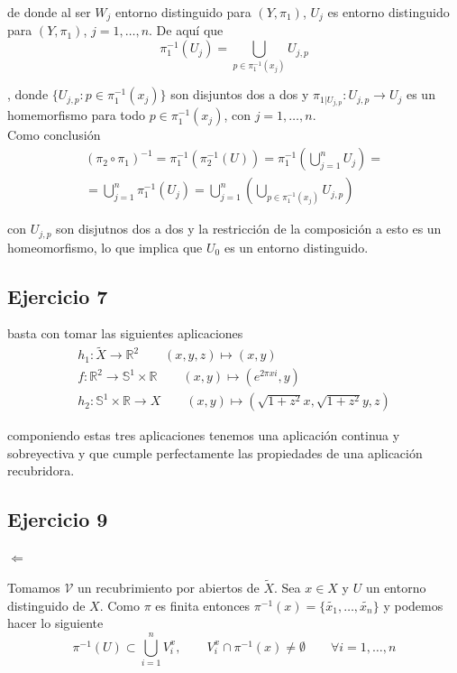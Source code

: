 \documentclass{article}
\begin{document}
de donde al ser $W_j$ entorno distinguido para $(Y,\pi_1)$, $U_j$ es entorno distinguido para $(Y,\pi_1)$, $j=1,\ldots,n$. De aquí que
\begin{equation*}
\pi_1^{-1}(U_j)=\bigcup_{p\in \pi_1^{-1}(x_j)} U_{j,p}
\end{equation*}

, donde $\{U_{j,p}: p\in \pi_1^{-1}(x_j)\}$ son disjuntos dos a dos y $\pi_{1|U_{j,p}}:U_{j,p}\rightarrow U_j$ es un homemorfismo para todo $p\in \pi_1^{-1}(x_j)$, con $j=1,\ldots,n$.\\

Como conclusión
\begin{gather*}
(\pi_2\circ \pi_1)^{-1}=\pi_1^{-1}(\pi_2^{-1}(U))=\pi_1^{-1}(\bigcup_{j=1}^n U_j)=\\
=\bigcup_{j=1}^n \pi_1^{-1}(U_j)=\bigcup_{j=1}^n(\bigcup_{p\in \pi_1^{-1}(x_j)} U_{j,p})
\end{gather*}

con $U_{j,p}$ son disjutnos dos a dos y la restricción de la composición a esto es un homeomorfismo, lo que implica que $U_0$ es un entorno distinguido.

\subsection{Ejercicio 7}
basta con tomar las siguientes aplicaciones
\begin{gather*}
h_1:\tilde{X}\rightarrow \mathbb{R}^2 \qquad (x,y,z)\mapsto (x,y)\\
f:\mathbb{R}^2\rightarrow \mathbb{S}^1\times \mathbb{R}\qquad (x,y)\mapsto (e^{2\pi xi}, y)\\
h_2:\mathbb{S}^1\times \mathbb{R}\rightarrow X \qquad (x,y)\mapsto(\sqrt{1+z^2} x,\sqrt{1+z^2}y,z)
\end{gather*}

componiendo estas tres aplicaciones tenemos una aplicación continua y sobreyectiva y que cumple perfectamente las propiedades de una aplicación recubridora.

\subsection{Ejercicio 9}
$\Leftarrow$

Tomamos $\mathcal{V}$ un recubrimiento por abiertos de $\tilde{X}$. Sea $x\in X$ y $U$ un entorno distinguido de $X$. Como $\pi$ es finita entonces $\pi^{-1}(x)=\{\tilde{x_1},\ldots,\tilde{x_n}\}$ y podemos hacer lo siguiente
\begin{equation*}
\pi^{-1}(U)\subset \bigcup_{i=1}^n V_i^x,\qquad V_i^x \cap \pi^{-1}(x)\neq \emptyset\qquad \forall i=1,\ldots,n
\end{equation*}
\end{document}
